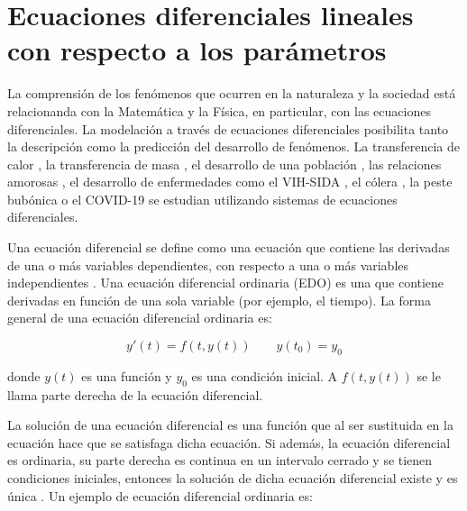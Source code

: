 
\section{Ecuaciones diferenciales lineales con respecto a los parámetros}\label{section:differential_equation_lineal_in_params}

La comprensión de los fenómenos que ocurren en la naturaleza y la sociedad está relacionanda con la Matemática y la Física, en particular, con las ecuaciones diferenciales. La modelación a través de ecuaciones diferenciales posibilita tanto la descripción como la predicción del desarrollo de fenómenos. La transferencia de calor \cite{p-transferencia-calor}, la transferencia de masa \cite{p-transferencia-masa}, el desarrollo de una población \cite{p-desarrollo-poblacion}, las relaciones amorosas \cite{p-amor}, el desarrollo de enfermedades como el VIH-SIDA \cite{p-desarrollo-vih}, el cólera \cite{p-desarrollo-colera}, la peste bubónica \cite{p-desarrollo-peste} o el COVID-19 \cite{p-desarrollo-covid} se estudian utilizando sistemas de ecuaciones diferenciales.

Una ecuación diferencial se define como una ecuación que contiene las derivadas de una o más variables dependientes, con respecto a una o más variables independientes \cite{gaucel2014learning}. Una ecuación diferencial ordinaria (EDO) es una que contiene derivadas en función de una sola variable (por ejemplo, el tiempo). La forma general de una ecuación diferencial ordinaria es:

$$y'(t)=f(t, y(t)) \qquad y(t_0) = y_0$$

donde $y(t)$ es una función y $y_0$ es una condición inicial. A $f(t, y(t))$ se le llama parte derecha de la ecuación diferencial.

La solución de una ecuación diferencial es una función que al ser sustituida en la ecuación hace que se satisfaga dicha ecuación. Si además, la ecuación diferencial es ordinaria, su parte derecha es continua en un intervalo cerrado y se tienen condiciones iniciales, entonces la solución de dicha ecuación diferencial existe y es única \cite{zill2012first}. Un ejemplo de ecuación diferencial ordinaria es:


